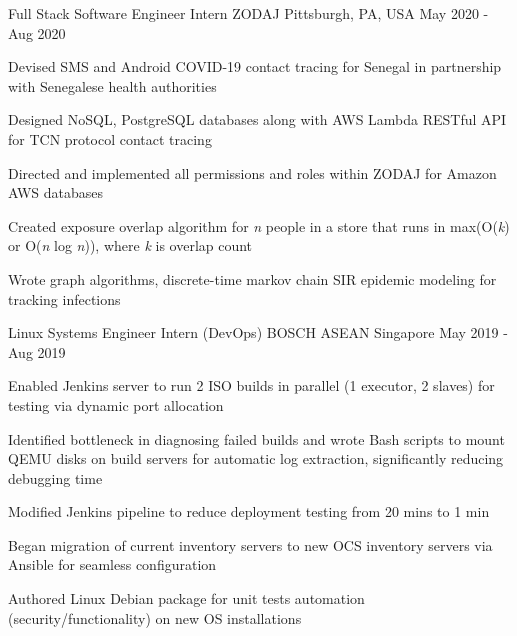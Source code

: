 

\begin{cventries}

  \cventry
    {Full Stack Software Engineer Intern} %
    {ZODAJ} %
    {Pittsburgh, PA, USA} %
    {May 2020 - Aug 2020} %
    {
      \begin{cvitems} %
        \item {Devised SMS and Android COVID-19 contact tracing for Senegal in partnership with Senegalese health authorities}
        \item {Designed NoSQL, PostgreSQL databases along with AWS Lambda RESTful API for TCN protocol contact tracing}
        \item {Directed and implemented all permissions and roles within ZODAJ for Amazon AWS databases}
        \item {Created exposure overlap algorithm for \textit{n} people in a store that runs in max(O(\textit{k}) or O(\textit{n} log \textit{n})), where \textit{k} is overlap count}
        \item {Wrote graph algorithms, discrete-time markov chain SIR epidemic modeling for tracking infections}
      \end{cvitems}
    }

  \cventry
    {Linux Systems Engineer Intern (DevOps)} %
    {BOSCH ASEAN} %
    {Singapore} %
    {May 2019 - Aug 2019} %
    {
      \begin{cvitems} %
        \item {Enabled Jenkins server to run 2 ISO builds in parallel (1 executor, 2 slaves) for testing via dynamic port allocation}
        \item {Identified bottleneck in diagnosing failed builds and wrote Bash scripts to mount QEMU disks on build servers for automatic log extraction, significantly reducing debugging time}
        \item {Modified Jenkins pipeline to reduce deployment testing from 20 mins to 1 min}
        \item {Began migration of current inventory servers to new OCS inventory servers via Ansible for seamless configuration}
        \item {Authored Linux Debian package for unit tests automation (security/functionality) on new OS installations}
      \end{cvitems}
    }


\end{cventries}
